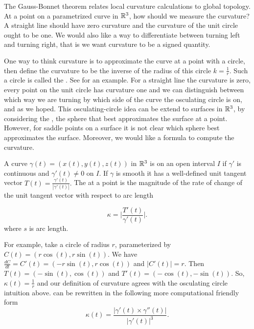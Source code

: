 
The Gauss-Bonnet theorem relates local curvature calculations
to global topology. 
At a point on a parametrized curve  in $\mathbb{R}^3$,
how should we measure the curvature?
A straight line should have zero curvature and the curvature of the unit circle ought to be one.
We would also like a way to differentiate
between turning left and turning right, that is we want curvature to be a signed quantity.


One way to think curvature is to approximate the curve at a point with a circle,
then define the curvature to be the inverse of the radius of this circle $k=\frac{1}{r}$.
Such a circle is called the .
See  for an example.
For a straight line the curvature is zero, 
every point on the unit circle has curvature one 
and we can distinguish between
which way we are turning by which side of the curve the osculating circle is on,
 and as we hoped.
 This osculating-circle idea can be extend
to  surfaces in $\mathbb{R}^3$, by considering the ,
 the sphere that best approximates the surface at a point.
However, for saddle points on a surface it is not clear which sphere
best approximates the surface. Moreover, we would like a formula to compute the curvature.

A curve $\gamma(t)=(x(t),y(t),z(t))$ in $\mathbb{R}^3$ is  on an open interval $I$
if $\gamma'$ is continuous and $\gamma'(t)\neq 0$ on $I$. 
If $\gamma$ is smooth it has a well-defined unit tangent vector $T(t)=\frac{\gamma'(t)}{|\gamma'(t)|}.$
The  at a point is the magnitude of the rate of change of the unit tangent vector with 
respect to arc length

\begin{equation} \label{eqn:kappa}
\kappa=\bigg  | \frac{T'(t)}{\gamma'(t)}\bigg |.
\end{equation}
where $s$ is arc length.

For example, take a circle of radius $r$, parameterized by $C(t)=\left(r\cos(t),r\sin(t)\right)$.
We have $\frac{dC}{dt}=C'(t)=\left(-r\sin(t),r\cos(t)\right)$ and $|C'(t)|=r$.
Then $T(t)=\left(-\sin(t),\cos(t)\right)$ and $T'(t)=\left(-\cos(t),-\sin(t)\right)$.
So, $\kappa(t)=\frac{1}{r}$ and our definition of curvature agrees with the
osculating circle intuition above. 
 can be rewritten in the following more computational friendly form 
\begin{equation} \label{eqn:kappa1}
\kappa(t)=\frac{|\gamma'(t)\times \gamma''(t)|}{|\gamma'(t)|^3}.
\end{equation}


